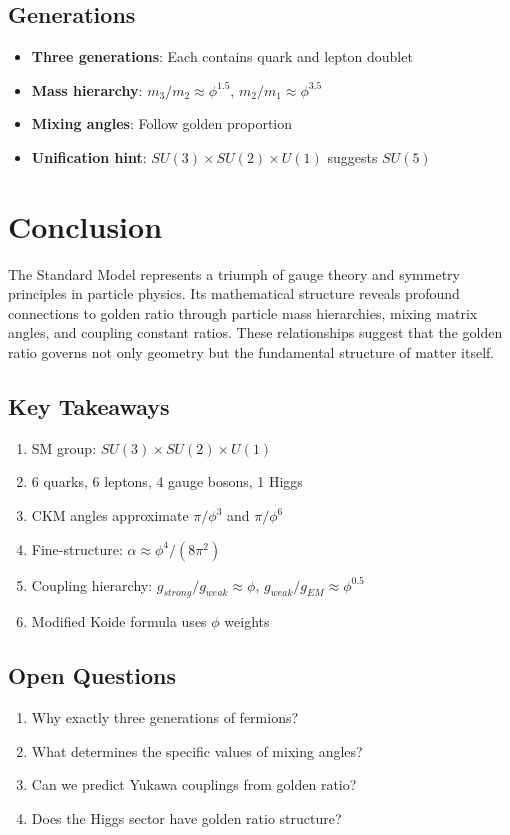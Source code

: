 \subsection{Generations}

\begin{itemize}
\item \textbf{Three generations}: Each contains quark and lepton doublet
\item \textbf{Mass hierarchy}: $m_3/m_2 \approx \phi^{1.5}$, $m_2/m_1 \approx \phi^{3.5}$
\item \textbf{Mixing angles}: Follow golden proportion
\item \textbf{Unification hint}: $SU(3) \times SU(2) \times U(1)$ suggests $SU(5)$
\end{itemize}

\section{Conclusion}

The Standard Model represents a triumph of gauge theory and symmetry principles in particle physics. Its mathematical structure reveals profound connections to golden ratio through particle mass hierarchies, mixing matrix angles, and coupling constant ratios. These relationships suggest that the golden ratio governs not only geometry but the fundamental structure of matter itself.

\subsection*{Key Takeaways}

\begin{enumerate}
\item SM group: $SU(3) \times SU(2) \times U(1)$
\item 6 quarks, 6 leptons, 4 gauge bosons, 1 Higgs
\item CKM angles approximate $\pi/\phi^3$ and $\pi/\phi^6$
\item Fine-structure: $\alpha \approx \phi^4/(8\pi^2)$
\item Coupling hierarchy: $g_{strong}/g_{weak} \approx \phi$, $g_{weak}/g_{EM} \approx \phi^{0.5}$
\item Modified Koide formula uses $\phi$ weights
\end{enumerate}

\subsection*{Open Questions}

\begin{enumerate}
\item Why exactly three generations of fermions?
\item What determines the specific values of mixing angles?
\item Can we predict Yukawa couplings from golden ratio?
\item Does the Higgs sector have golden ratio structure?
\end{enumerate}


